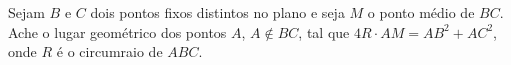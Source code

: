 Sejam $B$ e $C$ dois pontos fixos distintos no plano e seja $M$ o ponto médio de $BC$.
Ache o lugar geométrico dos pontos $A$, $A \not\in BC$, tal que $4R \cdot AM = AB^2 + AC^2$, onde $R$ é o circumraio de $ABC$.

